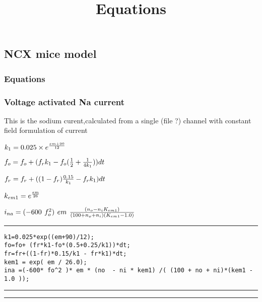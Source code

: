 \documentclass[11pt]{article}
\title{Equations}
\begin{document}
    
    
    \maketitle
    
    

    
    \subsection{NCX mice model}\label{ncx-mice-model}

    \subsubsection{Equations}\label{equations}

    \subsubsection{Voltage activated Na
current}\label{voltage-activated-na-current}

This is the sodium curent,calculated from a single (file ?) channel with
constant field formulation of current

    \(\large{k_1 = 0.025 \times e^{\frac{em+90}{12}}}\)

\(\large{f_o = f_o + (f_rk_1 - f_o(\frac{1}{2} + \frac{1}{4k_1}))dt}\)

\(\large{f_r = f_r + ((1-f_r)\frac{0.15}{k_1} - f_rk_1)dt}\)

\(\large{k_{em1} = e^{\frac{em}{26}}}\)

\(\large{ i_{na} = (-600~f_o^{2})~em~\frac{(n_o -n_iK_{em1})}{(100 + n_o + n_i)(K_{em1} -1.0)} }\)

    \begin{center}\rule{0.5\linewidth}{\linethickness}\end{center}

    \begin{verbatim}
k1=0.025*exp((em+90)/12);
fo=fo+ (fr*k1-fo*(0.5+0.25/k1))*dt;
fr=fr+((1-fr)*0.15/k1 - fr*k1)*dt;
kem1 = exp( em / 26.0);
ina =(-600* fo^2 )* em * (no  - ni * kem1) /( (100 + no + ni)*(kem1 - 1.0 ));
\end{verbatim}

    \begin{center}\rule{0.5\linewidth}{\linethickness}\end{center}

    \begin{center}\rule{0.5\linewidth}{\linethickness}\end{center}
\end{document}
